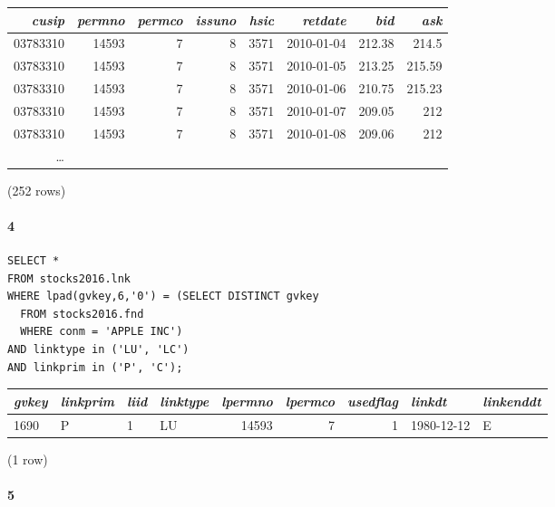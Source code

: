 \documentclass[]{article}
\let\oldparagraph\paragraph
\renewcommand{\paragraph}[1]{\oldparagraph{#1}\mbox{}}
\begin{document}
\begin{center}
\begin{tabular}{r | r | r | r | r | r | r | r }
\textit{cusip} & \textit{permno} & \textit{permco} & \textit{issuno} & \textit{hsic} & \textit{retdate} & \textit{bid} & \textit{ask} \\
\hline
03783310 & 14593 & 7 & 8 & 3571 & 2010-01-04 & 212.38 & 214.5  \\
03783310 & 14593 & 7 & 8 & 3571 & 2010-01-05 & 213.25 & 215.59  \\
03783310 & 14593 & 7 & 8 & 3571 & 2010-01-06 & 210.75 & 215.23  \\ 
03783310 & 14593 & 7 & 8 & 3571 & 2010-01-07 & 209.05 & 212  \\
03783310 & 14593 & 7 & 8 & 3571 & 2010-01-08 & 209.06 & 212  \\
\ldots \\
\end{tabular}

\noindent (252 rows) \\
\end{center}

\paragraph{4} 

\color{blue}
\begin{verbatim}
SELECT *
FROM stocks2016.lnk
WHERE lpad(gvkey,6,'0') = (SELECT DISTINCT gvkey
  FROM stocks2016.fnd
  WHERE conm = 'APPLE INC')
AND linktype in ('LU', 'LC')
AND linkprim in ('P', 'C');
\end{verbatim}
\color{black}

\begin{center}
\begin{tabular}{l | l | l | l | r | r | r | l | l}
\textit{gvkey} & \textit{linkprim} & \textit{liid} & \textit{linktype} & \textit{lpermno} & \textit{lpermco} & \textit{usedflag} & \textit{linkdt} & \textit{linkenddt} \\
\hline
1690 & P & 1 & LU & 14593 & 7 & 1 & 1980-12-12 & E \\
\end{tabular}

\noindent (1 row) \\
\end{center}

\paragraph{5} 
\end{document}
